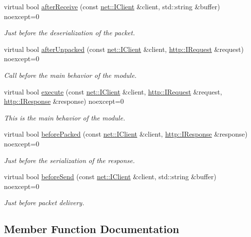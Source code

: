 \begin{DoxyCompactItemize}
virtual bool \hyperlink{structmodule_1_1Api_ad8b56820e4f53bf65d34447184edef20}{after\+Receive} (const \hyperlink{structnet_1_1IClient}{net\+::\+I\+Client} \&client, std\+::string \&buffer) noexcept=0
\begin{DoxyCompactList}\small\item\em Just before the deserialization of the packet. \end{DoxyCompactList}\item 
virtual bool \hyperlink{structmodule_1_1Api_a291297e6d233e69b82c976e085f7c237}{after\+Unpacked} (const \hyperlink{structnet_1_1IClient}{net\+::\+I\+Client} \&client, \hyperlink{structhttp_1_1IRequest}{http\+::\+I\+Request} \&request) noexcept=0
\begin{DoxyCompactList}\small\item\em Call before the main behavior of the module. \end{DoxyCompactList}\item 
virtual bool \hyperlink{structmodule_1_1Api_afd1f5243a90811d06d96f725490bcba6}{execute} (const \hyperlink{structnet_1_1IClient}{net\+::\+I\+Client} \&client, \hyperlink{structhttp_1_1IRequest}{http\+::\+I\+Request} \&request, \hyperlink{structhttp_1_1IResponse}{http\+::\+I\+Response} \&response) noexcept=0
\begin{DoxyCompactList}\small\item\em This is the main behavior of the module. \end{DoxyCompactList}\item 
virtual bool \hyperlink{structmodule_1_1Api_a5293babe6b28a397b7a11f32da0a6f51}{before\+Packed} (const \hyperlink{structnet_1_1IClient}{net\+::\+I\+Client} \&client, \hyperlink{structhttp_1_1IResponse}{http\+::\+I\+Response} \&response) noexcept=0
\begin{DoxyCompactList}\small\item\em Just before the serialization of the response. \end{DoxyCompactList}\item 
virtual bool \hyperlink{structmodule_1_1Api_a71d1ada8bc5fc81fd71607315dd86185}{before\+Send} (const \hyperlink{structnet_1_1IClient}{net\+::\+I\+Client} \&client, std\+::string \&buffer) noexcept=0
\begin{DoxyCompactList}\small\item\em Just before packet delivery. \end{DoxyCompactList}\end{DoxyCompactItemize}


\subsection{Member Function Documentation}
\mbox{\label{structmodule_1_1Api_ad8b56820e4f53bf65d34447184edef20}} 
